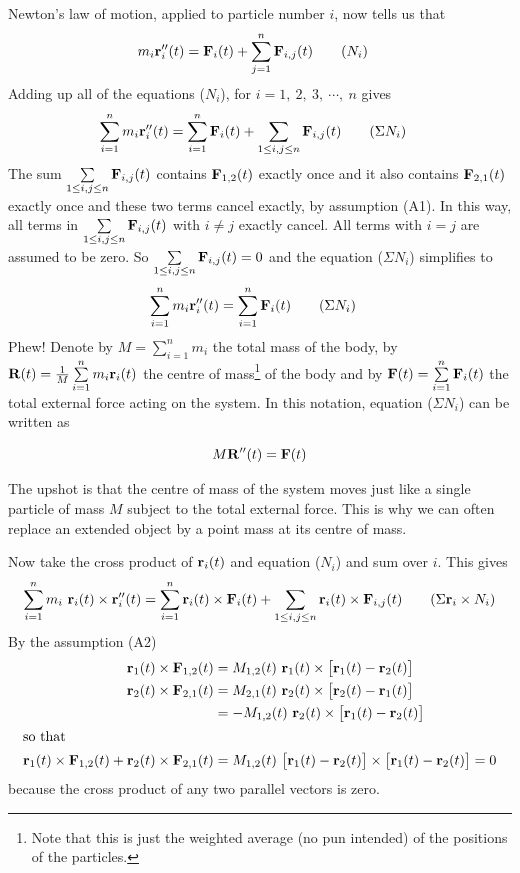 Newton's law of motion, applied to particle number $i$,  now tells us that
\begin{align}
m_i \mathbf{r}''_i(t)&= \mathbf{F}_i(t)+\sum_{j=1}^n \mathbf{F}_{i,j}(t)
\tag{$N_i$}\end{align}
Adding up all of the equations ($N_i$), 
for $i=1,\ 2,\ 3,\ \cdots,\ n$ gives
\begin{align}
\sum_{i=1}^n m_i \mathbf{r}''_i(t)&= \sum_{i=1}^n \mathbf{F}_i(t)+\sum_{1\le i,j\le n} \mathbf{F}_{i,j}(t)
\tag{$\Sigma N_i$}\end{align}
The sum $\sum\limits_{1\le i,j\le n} \mathbf{F}_{i,j}(t)$ contains $\mathbf{F}_{1,2}(t)$
exactly once and it also contains $\mathbf{F}_{2,1}(t)$ exactly once and these two
terms cancel exactly, by assumption (A1). In this way, all terms in 
$\sum\limits_{1\le i,j\le n} \mathbf{F}_{i,j}(t)$
with $i\ne j$ exactly cancel. All terms with $i=j$ are assumed to be zero.
So $\sum\limits_{1\le i,j\le n} \mathbf{F}_{i,j}(t)=0$ and the equation 
($\Sigma N_i$) simplifies to
\begin{align}
\sum_{i=1}^n m_i \mathbf{r}''_i(t)&= \sum_{i=1}^n \mathbf{F}_i(t)
\tag{$\Sigma N_i$}\end{align}
Phew! Denote by $M=\sum\limits_{i=1}^n m_i$ the total mass of the body,
by $\mathbf{R}(t)=\frac{1}{M}\sum\limits_{i=1}^n m_i\mathbf{r}_i(t)$  the centre of 
mass\footnote{Note that this is just the weighted average (no pun intended)
of the positions of the particles.} of the body and by 
$\mathbf{F}(t)=\sum\limits_{i=1}^n \mathbf{F}_i(t)$  the total external force acting
on the system. In this notation, equation ($\Sigma N_i$) can be written as
\begin{impeqn}\label{eqn:rigidCofM}
\begin{equation*}
M\mathbf{R}''(t)=\mathbf{F}(t)
\end{equation*}
\end{impeqn}
\noindent 
The upshot is that the centre of mass of the system moves just like 
a single particle of mass $M$ subject to the total external force.
This is why we can often replace an extended object by a point mass at its
centre of mass.

Now take the cross product of $\mathbf{r}_i(t)$ and equation ($N_i$) 
and sum over $i$. This gives
\begin{equation}
\sum_{i=1}^n m_i\ \vr_i(t)\times\vr''_i(t)
= \sum_{i=1}^n \vr_i(t)\times\vF_i(t)
+\sum_{1\le i,j\le n} \vr_i(t)\times\vF_{i,j}(t)
\tag{$\Sigma \vr_i\times N_i$}\end{equation}
By the assumption (A2)
\begin{align*}
\mathbf{r}_1(t)\times\mathbf{F}_{1,2}(t)
&=M_{1,2}(t)\ \mathbf{r}_1(t)\times\big[\mathbf{r}_1(t)-\mathbf{r}_2(t)\big]\\
\mathbf{r}_2(t)\times\mathbf{F}_{2,1}(t)
&=M_{2,1}(t)\ \mathbf{r}_2(t)\times\big[\mathbf{r}_2(t)-\mathbf{r}_1(t)\big]\\
&=-M_{1,2}(t)\ \mathbf{r}_2(t)\times\big[\mathbf{r}_1(t)-\mathbf{r}_2(t)\big]\\
\intertext{so that}
\mathbf{r}_1(t)\times\mathbf{F}_{1,2}(t)
+\mathbf{r}_2(t)\times\mathbf{F}_{2,1}(t)
&=M_{1,2}(t)\ \big[\mathbf{r}_1(t)-\mathbf{r}_2(t)\big]\times\big[\mathbf{r}_1(t)-\mathbf{r}_2(t)\big]
=0
\end{align*}
because the cross product of any two parallel vectors is zero.

